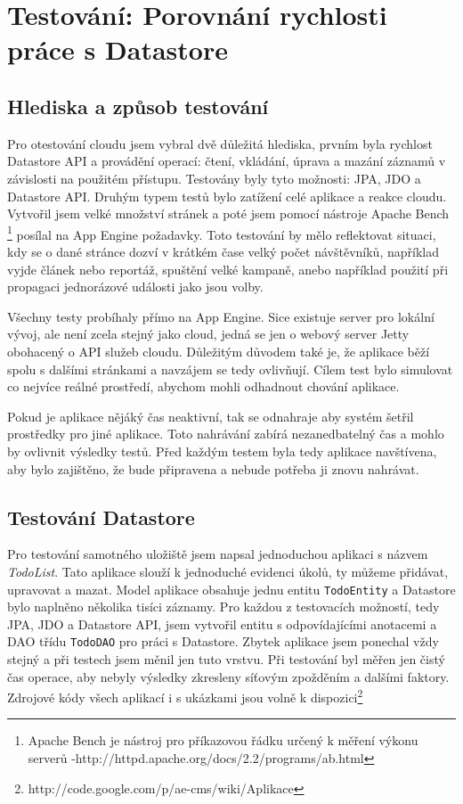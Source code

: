 \chapter{Testování: Porovnání rychlosti práce s Datastore}

\section{Hlediska a způsob testování}
Pro otestování cloudu jsem vybral dvě důležitá hlediska, prvním byla rychlost Datastore API a provádění operací: čtení, vkládání, úprava a mazání záznamů v závislosti na použitém přístupu. Testovány byly tyto možnosti: JPA, JDO a Datastore API. Druhým typem testů bylo zatížení celé aplikace a reakce cloudu. Vytvořil jsem velké množství stránek a poté jsem pomocí nástroje Apache Bench \footnote{Apache Bench je nástroj pro příkazovou řádku určený k měření výkonu serverů -http://httpd.apache.org/docs/2.2/programs/ab.html}  posílal na App Engine požadavky. Toto testování by mělo reflektovat situaci, kdy se o dané stránce dozví v krátkém čase velký počet návštěvníků, například vyjde článek nebo reportáž, spuštění velké kampaně, anebo například použití při propagaci jednorázové události jako jsou volby.

Všechny testy probíhaly přímo na App Engine. Sice existuje server pro lokální vývoj, ale není zcela stejný jako cloud, jedná se jen o webový server Jetty obohacený o API služeb cloudu. Důležitým důvodem také je, že aplikace běží spolu s dalšími stránkami a navzájem se tedy ovlivňují. Cílem test bylo simulovat co nejvíce reálné prostředí, abychom mohli odhadnout chování aplikace.  

Pokud je aplikace nějáký čas neaktivní, tak se odnahraje aby systém šetřil prostředky pro jiné aplikace. Toto nahrávání zabírá nezanedbatelný čas a mohlo by ovlivnit výsledky testů. Před každým testem byla tedy aplikace navštívena, aby bylo zajištěno, že bude připravena a nebude potřeba ji znovu nahrávat.

\section{Testování Datastore}
Pro testování samotného uložiště jsem napsal jednoduchou aplikaci s názvem \emph{TodoList}. Tato aplikace slouží k jednoduché evidenci úkolů, ty můžeme přidávat, upravovat a mazat. Model aplikace obsahuje jednu entitu \verb|TodoEntity| a Datastore bylo naplněno několika tisíci záznamy. Pro každou z testovacích možností, tedy JPA, JDO a Datastore API, jsem vytvořil entitu s odpovídajícími anotacemi a DAO třídu \verb|TodoDAO| pro práci s Datastore. Zbytek aplikace jsem ponechal vždy stejný a při testech jsem měnil jen tuto vrstvu. Při testování byl měřen jen čistý čas operace, aby nebyly výsledky zkresleny síťovým zpožděním a dalšími faktory. Zdrojové kódy všech aplikací i s ukázkami jsou volně k dispozici\footnote{http://code.google.com/p/ae-cms/wiki/Aplikace}

